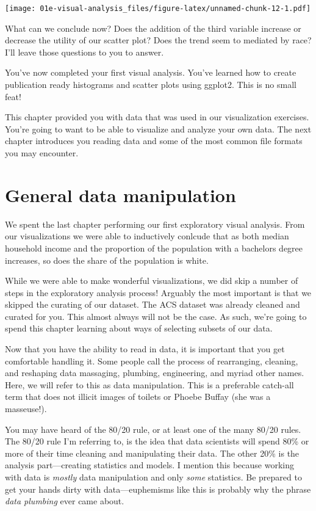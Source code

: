 \documentclass[
]{book}
\begin{document}
\texttt{[image: 01e-visual-analysis\_files/figure-latex/unnamed-chunk-12-1.pdf]}

What can we conclude now? Does the addition of the third variable increase or decrease the utility of our scatter plot? Does the trend seem to mediated by race? I'll leave those questions to you to answer.

You've now completed your first visual analysis. You've learned how to create publication ready histograms and scatter plots using ggplot2. This is no small feat!

This chapter provided you with data that was used in our visualization exercises. You're going to want to be able to visualize and analyze your own data. The next chapter introduces you reading data and some of the most common file formats you may encounter.

\hypertarget{general-data-manipulation}{%
\chapter{General data manipulation}\label{general-data-manipulation}}

We spent the last chapter performing our first exploratory visual analysis. From our visualizations we were able to inductively conlcude that as both median household income and the proportion of the population with a bachelors degree increases, so does the share of the population is white.

While we were able to make wonderful visualizations, we did skip a number of steps in the exploratory analysis process! Arguably the most important is that we skipped the curating of our dataset. The ACS dataset was already cleaned and curated for you. This almost always will not be the case. As such, we're going to spend this chapter learning about ways of selecting subsets of our data.

Now that you have the ability to read in data, it is important that you get comfortable handling it. Some people call the process of rearranging, cleaning, and reshaping data massaging, plumbing, engineering, and myriad other names. Here, we will refer to this as data manipulation. This is a preferable catch-all term that does not illicit images of toilets or Phoebe Buffay (she was a masseuse!).

You may have heard of the 80/20 rule, or at least one of the many 80/20 rules. The 80/20 rule I'm referring to, is the idea that data scientists will spend 80\% or more of their time cleaning and manipulating their data. The other 20\% is the analysis part---creating statistics and models. I mention this because working with data is \emph{mostly} data manipulation and only \emph{some} statistics. Be prepared to get your hands dirty with data---euphemisms like this is probably why the phrase \emph{data plumbing} ever came about.
\end{document}
